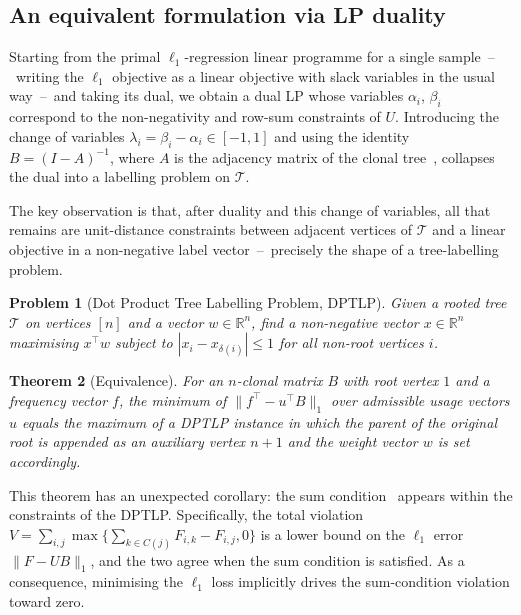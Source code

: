 \documentclass[11pt]{article}
\newtheorem{theorem}{Theorem}
\newtheorem{problem}[theorem]{Problem}
\begin{document}
\subsection{An equivalent formulation via LP duality}

Starting from the primal $\ell_1$-regression linear programme for a single sample~--~writing the $\ell_1$ objective as a linear objective with slack variables in the usual way~--~and taking its dual, we obtain a dual LP whose variables $\alpha_i$, $\beta_i$ correspond to the non-negativity and row-sum constraints of $U$. Introducing the change of variables $\lambda_i = \beta_i - \alpha_i \in [-1, 1]$ and using the identity $B = (I - A)^{-1}$, where $A$ is the adjacency matrix of the clonal tree~\citep{elkebir2015reconstruction}, collapses the dual into a labelling problem on $\mathcal{T}$.

The key observation is that, after duality and this change of variables, all that remains are unit-distance constraints between adjacent vertices of $\mathcal{T}$ and a linear objective in a non-negative label vector~--~precisely the shape of a tree-labelling problem.

\begin{problem}[Dot Product Tree Labelling Problem, DPTLP]
Given a rooted tree $\mathcal{T}$ on vertices $[n]$ and a vector $w\in\mathbb{R}^n$, find a non-negative vector $x\in\mathbb{R}^n$ maximising $x^\top w$ subject to $|x_i - x_{\delta(i)}| \leq 1$ for all non-root vertices $i$.
\end{problem}

\begin{theorem}[Equivalence]
For an $n$-clonal matrix $B$ with root vertex $1$ and a frequency vector $f$, the minimum of $\|f^\top - u^\top B\|_1$ over admissible usage vectors $u$ equals the maximum of a DPTLP instance in which the parent of the original root is appended as an auxiliary vertex $n+1$ and the weight vector $w$ is set accordingly.
\end{theorem}

This theorem has an unexpected corollary: the sum condition~\citep{elkebir2015reconstruction,popic2015lichee,malikic2015citup} appears within the constraints of the DPTLP. Specifically, the total violation $V=\sum_{i,j}\max\{\sum_{k\in C(j)} F_{i,k} - F_{i,j}, 0\}$ is a lower bound on the $\ell_1$ error $\|F - UB\|_1$, and the two agree when the sum condition is satisfied. As a consequence, minimising the $\ell_1$ loss implicitly drives the sum-condition violation toward zero.
\end{document}
